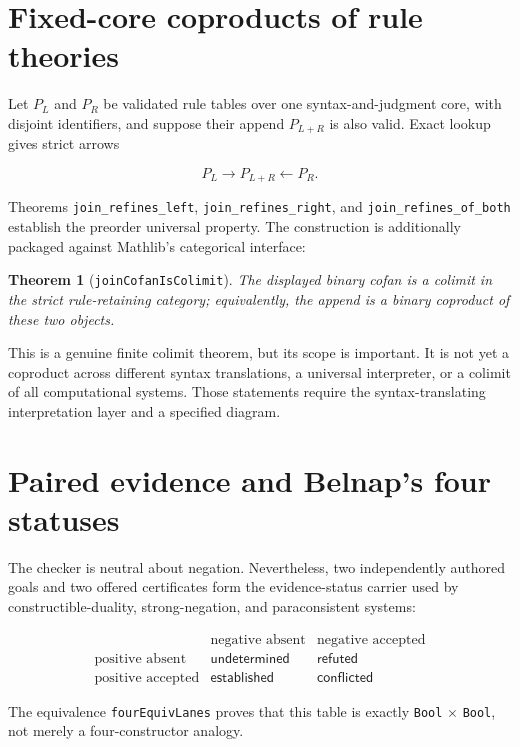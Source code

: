 \documentclass[]{article}
\newtheorem{theorem}{Theorem}
\theoremstyle{remark}
\newcommand{\code}[1]{\texttt{#1}}
\begin{document}
\section{Fixed-core coproducts of rule theories}
\label{sec:joins}

Let $P_L$ and $P_R$ be validated rule tables over one syntax-and-judgment
core, with disjoint identifiers, and suppose their append $P_{L\mathbin{+}R}$
is also valid.  Exact lookup gives strict arrows

\[
       P_L \longrightarrow P_{L\mathbin{+}R}
       \longleftarrow P_R.
\]

Theorems \code{join\_refines\_left},
\code{join\_refines\_right}, and
\code{join\_refines\_of\_both} establish the preorder universal property.
The construction is additionally packaged against Mathlib's categorical
interface:

\begin{theorem}[\code{joinCofanIsColimit}]
The displayed binary cofan is a colimit in the strict rule-retaining
category; equivalently, the append is a binary coproduct of these two
objects.
\end{theorem}

This is a genuine finite colimit theorem, but its scope is important.  It is
not yet a coproduct across different syntax translations, a universal
interpreter, or a colimit of all computational systems.  Those statements
require the syntax-translating interpretation layer and a specified diagram.

\section{Paired evidence and Belnap's four statuses}
\label{sec:four}

The checker is neutral about negation.  Nevertheless, two independently
authored goals and two offered certificates form the evidence-status carrier
used by constructible-duality, strong-negation, and paraconsistent systems:

\[
\begin{array}{c|cc}
 & \text{negative absent} & \text{negative accepted}\\ \hline
\text{positive absent}   & \mathsf{undetermined} & \mathsf{refuted}\\
\text{positive accepted} & \mathsf{established}  & \mathsf{conflicted}
\end{array}
\]

The equivalence \code{fourEquivLanes} proves that this table is exactly
\code{Bool} $\times$ \code{Bool}, not merely a four-constructor analogy.
\end{document}
